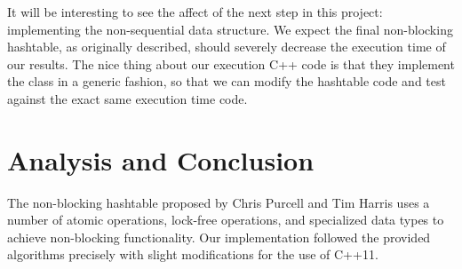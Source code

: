 \documentclass[journal]{IEEEtran}
\begin{document}
It will be interesting to see the affect of the next step in this project: implementing the non-sequential data structure. We expect the final non-blocking hashtable, as originally described, should severely decrease the execution time of our results. The nice thing about our execution C++ code is that they implement the class in a generic fashion, so that we can modify the hashtable code and test against the exact same execution time code.



\section{Analysis and Conclusion}

The non-blocking hashtable proposed by Chris Purcell and Tim Harris uses a number of atomic operations, lock-free operations, and specialized data types to achieve non-blocking functionality.  Our implementation followed the provided algorithms precisely with slight modifications for the use of C++11. 


\ifCLASSOPTIONcaptionsoff
  \newpage
\fi



\end{document}
